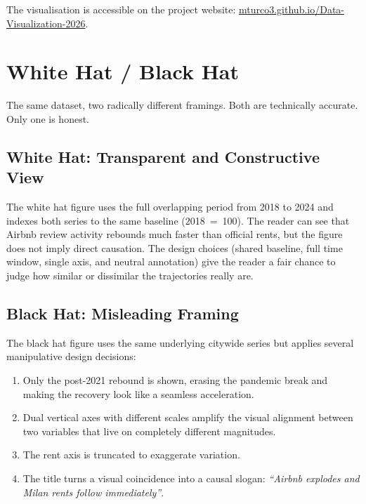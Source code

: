 \documentclass[11pt, a4paper]{article}
\begin{document}
The visualisation is accessible on the project website:
\href{https://mturco3.github.io/Data-Visualization-2026/}{mturco3.github.io/Data-Visualization-2026}.

\section{White Hat / Black Hat}
\label{sec:hats}

The same dataset, two radically different framings. Both are technically accurate. Only one
is honest.

\subsection{White Hat: Transparent and Constructive View}

The white hat figure uses the full overlapping period from 2018 to 2024 and indexes both
series to the same baseline (2018~=~100). The reader can see that Airbnb review activity
rebounds much faster than official rents, but the figure does not imply direct causation. The
design choices (shared baseline, full time window, single axis, and neutral annotation)
give the reader a fair chance to judge how similar or dissimilar the trajectories really are.

\subsection{Black Hat: Misleading Framing}

The black hat figure uses the same underlying citywide series but applies several manipulative
design decisions:

\begin{enumerate}[leftmargin=1.6em]
  \item Only the post-2021 rebound is shown, erasing the pandemic break and making the
        recovery look like a seamless acceleration.
  \item Dual vertical axes with different scales amplify the visual alignment between two
        variables that live on completely different magnitudes.
  \item The rent axis is truncated to exaggerate variation.
  \item The title turns a visual coincidence into a causal slogan:
        \emph{``Airbnb explodes and Milan rents follow immediately''}.
\end{enumerate}
\end{document}
